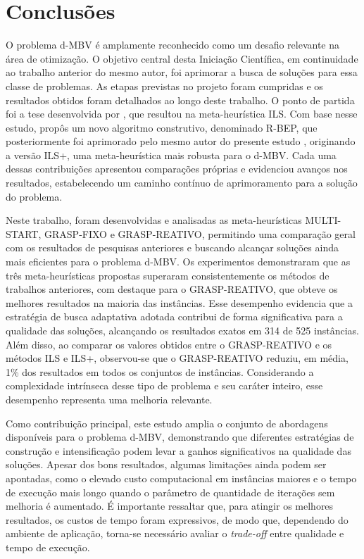 \section{Conclusões}
\label{sec-conclusoes}

O problema d-MBV é amplamente reconhecido como um desafio relevante na área de otimização. O objetivo central desta Iniciação Científica, em continuidade ao trabalho anterior do mesmo autor, foi aprimorar a busca de soluções para essa classe de problemas. As etapas previstas no projeto foram cumpridas e os resultados obtidos foram detalhados ao longo deste trabalho. O ponto de partida foi a tese desenvolvida por \cite{morenotese:2018}, que resultou na meta-heurística ILS. Com base nesse estudo, \cite{oliveira:2023} propôs um novo algoritmo construtivo, denominado R-BEP, que posteriormente foi aprimorado pelo mesmo autor do presente estudo \cite{silva2024ils}, originando a versão ILS+, uma meta-heurística mais robusta para o d-MBV. Cada uma dessas contribuições apresentou comparações próprias e evidenciou avanços nos resultados, estabelecendo um caminho contínuo de aprimoramento para a solução do problema.

Neste trabalho, foram desenvolvidas e analisadas as meta-heurísticas MULTI-START, GRASP-FIXO e GRASP-REATIVO, permitindo uma comparação geral com os resultados de pesquisas anteriores e buscando alcançar soluções ainda mais eficientes para o problema d-MBV. Os experimentos demonstraram que as três meta-heurísticas propostas superaram consistentemente os métodos de trabalhos anteriores, com destaque para o GRASP-REATIVO, que obteve os melhores resultados na maioria das instâncias. Esse desempenho evidencia que a estratégia de busca adaptativa adotada contribui de forma significativa para a qualidade das soluções, alcançando os resultados exatos em 314 de 525 instâncias. Além disso, ao comparar os valores obtidos entre o GRASP-REATIVO e os métodos ILS e ILS+, observou-se que o GRASP-REATIVO reduziu, em média, 1\% dos resultados em todos os conjuntos de instâncias. Considerando a complexidade intrínseca desse tipo de problema e seu caráter inteiro, esse desempenho representa uma melhoria relevante.

Como contribuição principal, este estudo amplia o conjunto de abordagens disponíveis para o problema d-MBV, demonstrando que diferentes estratégias de construção e intensificação podem levar a ganhos significativos na qualidade das soluções. Apesar dos bons resultados, algumas limitações ainda podem ser apontadas, como o elevado custo computacional em instâncias maiores e o tempo de execução mais longo quando o parâmetro de quantidade de iterações sem melhoria é aumentado. É importante ressaltar que, para atingir os melhores resultados, os custos de tempo foram expressivos, de modo que, dependendo do ambiente de aplicação, torna-se necessário avaliar o \textit{trade-off} entre qualidade e tempo de execução.

